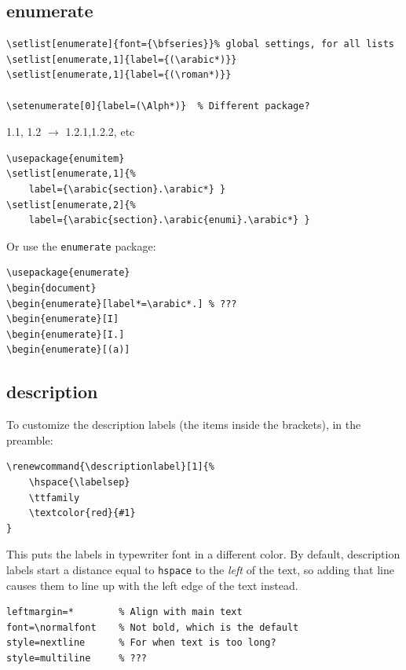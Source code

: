 \documentclass{article}
\renewcommand{\descriptionlabel}[1]{%
    \ttfamily\textcolor{cadet}{#1}
}
\begin{document}
\subsection{enumerate}
\begin{lstlisting}
\setlist[enumerate]{font={\bfseries}}% global settings, for all lists
\setlist[enumerate,1]{label={(\arabic*)}}
\setlist[enumerate,1]{label={(\roman*)}}

\setenumerate[0]{label=(\Alph*)}  % Different package?
\end{lstlisting}

1.1, 1.2 $\rightarrow$ 1.2.1,1.2.2, etc
\begin{lstlisting}
\usepackage{enumitem}
\setlist[enumerate,1]{%
    label={\arabic{section}.\arabic*} }
\setlist[enumerate,2]{%
    label={\arabic{section}.\arabic{enumi}.\arabic*} }
\end{lstlisting}
Or use the \texttt{enumerate} package:
\begin{lstlisting}
\usepackage{enumerate}
\begin{document}
\begin{enumerate}[label*=\arabic*.] % ???
\begin{enumerate}[I]
\begin{enumerate}[I.]
\begin{enumerate}[(a)]
\end{lstlisting}

\subsection{description}
To customize the description labels (the items inside the brackets), in the preamble:
\begin{lstlisting}
\renewcommand{\descriptionlabel}[1]{%
    \hspace{\labelsep}
    \ttfamily
    \textcolor{red}{#1}
}
\end{lstlisting}
This puts the labels in typewriter font in a different color.
By default, description labels start a distance equal to
\texttt{hspace} to the \emph{left} of the text, so adding that line
causes them to line up with the left edge of the text instead.

\begin{lstlisting}
leftmargin=*        % Align with main text
font=\normalfont    % Not bold, which is the default
style=nextline      % For when text is too long?
style=multiline     % ???
\end{lstlisting}
\end{document}
